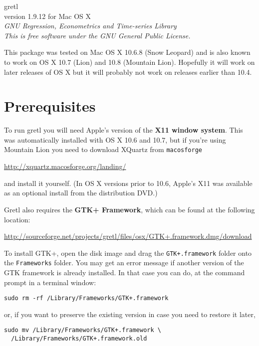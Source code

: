 \documentclass[11pt]{article}
\begin{document}
\begin{center}
{\color{gold} \titlefont gretl} \\[1ex]
version 1.9.12 for Mac OS X \\[2ex]

\textit{GNU Regression, Econometrics and Time-series Library\\
  This is free software under the GNU General Public License.}

\end{center}

This package was tested on Mac OS X 10.6.8 (Snow Leopard) and
is also known to work on OS X 10.7 (Lion) and 10.8 (Mountain Lion).
Hopefully it will work on later releases of OS X but it will probably
not work on releases earlier than 10.4.

\section{Prerequisites}
\label{sec:os}

To run \textsf{gretl} you will need Apple's version of the \textbf{X11
  window system}. This was automatically installed with OS X 10.6 and
10.7, but if you're using Mountain Lion you need to download XQuartz
from \texttt{macosforge}

\url{http://xquartz.macosforge.org/landing/}

and install it yourself. (In OS X versions prior to 10.6, Apple's X11 was 
available as an optional install from the distribution DVD.)

\textsf{Gretl} also requires the \textbf{GTK+ Framework}, which can be
found at the following location:

\url{http://sourceforge.net/projects/gretl/files/osx/GTK+.framework.dmg/download}

To install GTK+, open the disk image and drag the
\texttt{GTK+.framework} folder onto the \texttt{Frameworks}
folder. You may get an error message if another version of the GTK
framework is already installed. In that case you can do, at the
command prompt in a terminal window:

\verb|sudo rm -rf /Library/Frameworks/GTK+.framework|

or, if you want to preserve the existing version in case you need to
restore it later,
\begin{verbatim}
sudo mv /Library/Frameworks/GTK+.framework \
  /Library/Frameworks/GTK+.framework.old
\end{verbatim}
\end{document}
